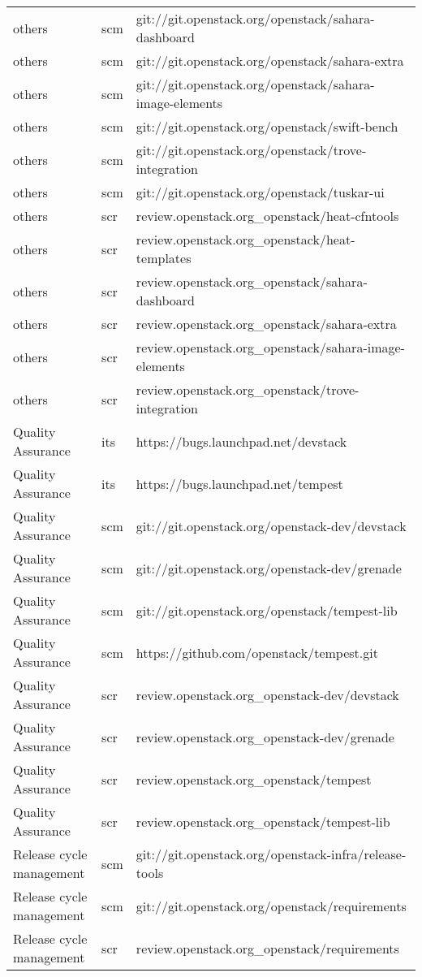 \begin{center}
\begin{longtable}{|p{4cm}|p{1cm}|p{10cm}|}
others&scm&git://git.openstack.org/openstack/sahara-dashboard\\ 
others&scm&git://git.openstack.org/openstack/sahara-extra\\ 
others&scm&git://git.openstack.org/openstack/sahara-image-elements\\ 
others&scm&git://git.openstack.org/openstack/swift-bench\\ 
others&scm&git://git.openstack.org/openstack/trove-integration\\ 
others&scm&git://git.openstack.org/openstack/tuskar-ui\\ 
others&scr&review.openstack.org\_openstack/heat-cfntools\\ 
others&scr&review.openstack.org\_openstack/heat-templates\\ 
others&scr&review.openstack.org\_openstack/sahara-dashboard\\ 
others&scr&review.openstack.org\_openstack/sahara-extra\\ 
others&scr&review.openstack.org\_openstack/sahara-image-elements\\ 
others&scr&review.openstack.org\_openstack/trove-integration\\ 
Quality Assurance&its&https://bugs.launchpad.net/devstack\\ 
Quality Assurance&its&https://bugs.launchpad.net/tempest\\ 
Quality Assurance&scm&git://git.openstack.org/openstack-dev/devstack\\ 
Quality Assurance&scm&git://git.openstack.org/openstack-dev/grenade\\ 
Quality Assurance&scm&git://git.openstack.org/openstack/tempest-lib\\ 
Quality Assurance&scm&https://github.com/openstack/tempest.git\\ 
Quality Assurance&scr&review.openstack.org\_openstack-dev/devstack\\ 
Quality Assurance&scr&review.openstack.org\_openstack-dev/grenade\\ 
Quality Assurance&scr&review.openstack.org\_openstack/tempest\\ 
Quality Assurance&scr&review.openstack.org\_openstack/tempest-lib\\ 
Release cycle management&scm&git://git.openstack.org/openstack-infra/release-tools\\ 
Release cycle management&scm&git://git.openstack.org/openstack/requirements\\ 
Release cycle management&scr&review.openstack.org\_openstack/requirements\\ 

\end{longtable}
\end{center}
